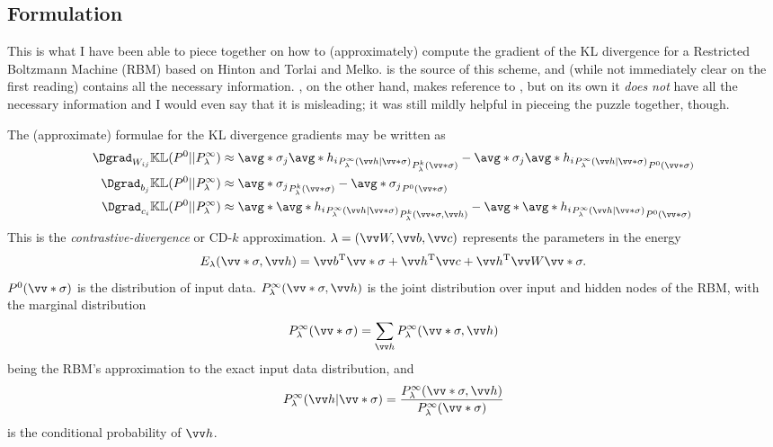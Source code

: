 \newcommand\Pdat{P^0}
\newcommand\Pk{P^k_\lambda}
\newcommand\Peq{P^\infty_\lambda}

\subsection{Formulation}
This is what I have been able to piece together on how to (approximately) compute the gradient
of the KL divergence for a Restricted Boltzmann Machine (RBM) based on Hinton\cite{Hinton2002}
and Torlai and Melko\cite{TorlaiMelko2016}. \cite{Hinton2002} is the source of this scheme,
and (while not immediately clear on the first reading) contains all the necessary information.
\cite{TorlaiMelko2016}, on the other hand, makes reference to \cite{Hinton2002}, but on its
own it \emph{does not} have all the necessary information and I would even say that it is
misleading; it was still mildly helpful in pieceing the puzzle together, though.

The (approximate) formulae for the KL divergence gradients may be written as
\begin{subequations}\label{eqn:kldiv-grad}\begin{align}
\label{eqn:kldiv-grad:W}
\Dgrad_{W_{ij}}\KL(\Pdat || \Peq)
&\approx \avg*{\sigma_j\avg*{h_i}_{\Peq(\vv h|\vv*\sigma)}}_{\Pk(\vv*\sigma)}
         - \avg*{\sigma_j\avg*{h_i}_{\Peq(\vv h|\vv*\sigma)}}_{\Pdat(\vv*\sigma)}
\\
\label{eqn:kldiv-grad:b}
\Dgrad_{b_j}\KL(\Pdat || \Peq)
&\approx \avg*{\sigma_j}_{\Pk(\vv*\sigma)} - \avg*{\sigma_j}_{\Pdat(\vv*\sigma)}
\\
\label{eqn:kldiv-grad:c}
\Dgrad_{c_i}\KL(\Pdat || \Peq)
&\approx \avg*{\avg*{h_i}_{\Peq(\vv h|\vv*\sigma)}}_{\Pk(\vv*\sigma, \vv h)}
         - \avg*{\avg*{h_i}_{\Peq(\vv h|\vv*\sigma)}}_{\Pdat(\vv*\sigma)}
\end{align}\end{subequations}
This is the \emph{contrastive-divergence} or CD-$k$ approximation. $\lambda = (\vv W, \vv b,
\vv c)$ represents the parameters in the energy
\begin{equation}
E_\lambda(\vv*\sigma, \vv h)
= \vv b\trans\vv*\sigma + \vv h\trans\vv c + \vv h\trans\vv W\vv*\sigma.
\end{equation}
$\Pdat(\vv*\sigma)$ is the distribution of input data. $\Peq(\vv*\sigma, \vv h)$
is the joint distribution over input and hidden nodes of the RBM, with the marginal
distribution
\begin{equation}
\Peq(\vv*\sigma) = \sum_{\vv h}\Peq(\vv*\sigma, \vv h)
\end{equation}
being the RBM's approximation to the exact input data distribution, and
\begin{equation}
\Peq(\vv h|\vv*\sigma) = \frac{\Peq(\vv*\sigma, \vv h)}{\Peq(\vv*\sigma)}
\end{equation}
is the conditional probability of $\vv h$.

